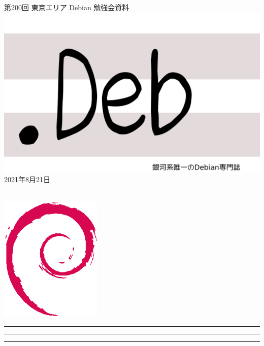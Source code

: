\documentclass[mingoth,a4paper]{jsarticle}
\newcommand{\debmtgyear}{2021}
\newcommand{\debmtgmonth}{8}
\newcommand{\debmtgdate}{21}
\newcommand{\debmtgnumber}{200}
\begin{document}
\begin{titlepage}
\thispagestyle{empty}

\vspace*{-2cm}
第\debmtgnumber{}回 東京エリア Debian 勉強会資料\\
\hspace*{-2cm}
\includegraphics{image-assets/dotdeb.pdf}\\
\hfill{}\debmtgyear{}年\debmtgmonth{}月\debmtgdate{}日

\\

\vspace*{-2cm}
\hfill{}\includegraphics[height=6cm]{image-assets/openlogo-nd.eps}
\end{titlepage}

\newpage

\begin{minipage}[b]{0.2\hsize}
 \colorbox{titleback}{}
\end{minipage}
\begin{minipage}[b]{0.8\hsize}
\hrule
\vspace{2mm}
\hrule
\begin{multicols}{2}
\tableofcontents
\end{multicols}
\vspace{2mm}
\hrule
\end{minipage}
\end{document}
